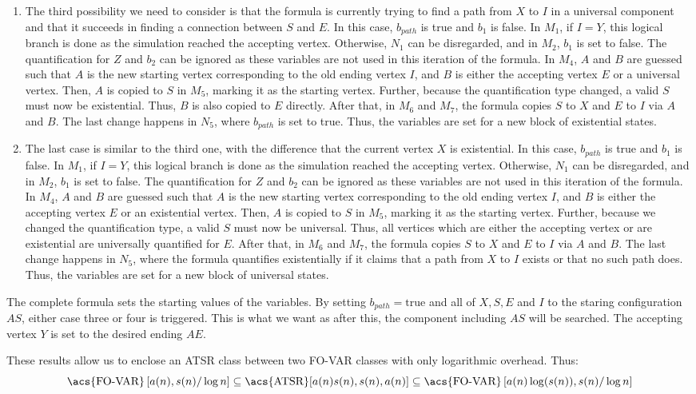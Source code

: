 \begin{enumerate}
    \item The third possibility we need to consider is that the formula is currently trying to find a path from $X$ to $I$ in a universal component and that it succeeds in finding a connection between $S$ and $E$.
    In this case, $b_{path}$ is true and $b_1$ is false.
    In $M_1$, if $I = Y$, this logical branch is done as the simulation reached the accepting vertex.
    Otherwise, $N_1$ can be disregarded, and in $M_2$, $b_1$ is set to false.
    The quantification for $Z$ and $b_2$ can be ignored as these variables are not used in this iteration of the formula.
    In $M_4$, $A$ and $B$ are guessed such that $A$ is the new starting vertex corresponding to the old ending vertex $I$, and $B$ is either the accepting vertex $E$ or a universal vertex.
    Then, $A$ is copied to $S$ in $M_5$, marking it as the starting vertex.
    Further, because the quantification type changed, a valid $S$ must now be existential.
    Thus, $B$ is also copied to $E$ directly.
    After that, in $M_6$ and $M_7$, the formula copies $S$ to $X$ and $E$ to $I$ via $A$ and $B$.
    The last change happens in $N_{5}$, where $b_{path}$ is set to true.
    Thus, the variables are set for a new block of existential states.

    \item The last case is similar to the third one, with the difference that the current vertex $X$ is existential.
    In this case, $b_{path}$ is true and $b_1$ is false.
    In $M_1$, if $I = Y$, this logical branch is done as the simulation reached the accepting vertex.
    Otherwise, $N_1$ can be disregarded, and in $M_2$, $b_1$ is set to false.
    The quantification for $Z$ and $b_2$ can be ignored as these variables are not used in this iteration of the formula.
    In $M_4$, $A$ and $B$ are guessed such that $A$ is the new starting vertex corresponding to the old ending vertex $I$, and $B$ is either the accepting vertex $E$ or an existential vertex.
    Then, $A$ is copied to $S$ in $M_5$, marking it as the starting vertex.
    Further, because we changed the quantification type, a valid $S$ must now be universal.
    Thus, all vertices which are either the accepting vertex or are existential are universally quantified for $E$.
    After that, in $M_6$ and $M_7$, the formula copies $S$ to $X$ and $E$ to $I$ via $A$ and $B$.
    The last change happens in $N_{5}$, where the formula quantifies existentially if it claims that a path from $X$ to $I$ exists or that no such path does.
    Thus, the variables are set for a new block of universal states.
\end{enumerate}
The complete formula sets the starting values of the variables.
By setting $b_{path} = \text{true}$ and all of $X, S, E$ and $I$ to the staring configuration $AS$, either case three or four is triggered.
This is what we want as after this, the component including $AS$ will be searched.
The accepting vertex $Y$ is set to the desired ending $AE$.

These results allow us to enclose an \acs{ATSR} class between two \acs{FO-VAR} classes with only logarithmic overhead.
Thus:
\[
    \text{\acs{FO-VAR}}\left[a(n), s(n)/\log n \right] \subseteq \text{\acs{ATSR}}[a(n)s(n), s(n), a(n)] \subseteq \text{\acs{FO-VAR}}\left[a(n)\log(s(n)), s(n)/\log n \right]
\]